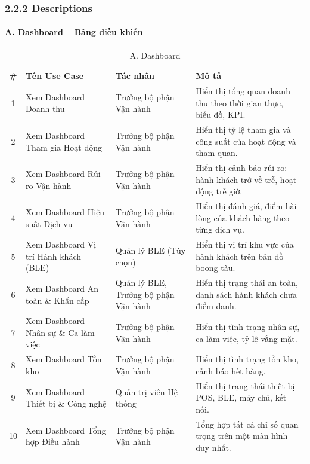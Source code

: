 \documentclass[12pt,a4paper]{article}
\begin{document}
	\subsubsection*{2.2.2 Descriptions}
	
	\paragraph{A. Dashboard -- Bảng điều khiển}
	\begin{longtable}{|c|p{4.5cm}|p{3.5cm}|p{4.5cm}|}
		\hline
		\textbf{\#} & \textbf{Tên Use Case} & \textbf{Tác nhân} & \textbf{Mô tả} \\
		\hline
		1 & Xem Dashboard Doanh thu & Trưởng bộ phận Vận hành & Hiển thị tổng quan doanh thu theo thời gian thực, biểu đồ, KPI. \\
		\hline
		2 & Xem Dashboard Tham gia Hoạt động & Trưởng bộ phận Vận hành & Hiển thị tỷ lệ tham gia và công suất của hoạt động và tham quan. \\
		\hline
		3 & Xem Dashboard Rủi ro Vận hành & Trưởng bộ phận Vận hành & Hiển thị cảnh báo rủi ro: hành khách trở về trễ, hoạt động trễ giờ. \\
		\hline
		4 & Xem Dashboard Hiệu suất Dịch vụ & Trưởng bộ phận Vận hành & Hiển thị đánh giá, điểm hài lòng của khách hàng theo từng dịch vụ. \\
		\hline
		5 & Xem Dashboard Vị trí Hành khách (BLE) & Quản lý BLE (Tùy chọn) & Hiển thị vị trí khu vực của hành khách trên bản đồ boong tàu. \\
		\hline
		6 & Xem Dashboard An toàn \& Khẩn cấp & Quản lý BLE, Trưởng bộ phận Vận hành & Hiển thị trạng thái an toàn, danh sách hành khách chưa điểm danh. \\
		\hline
		7 & Xem Dashboard Nhân sự \& Ca làm việc & Trưởng bộ phận Vận hành & Hiển thị tình trạng nhân sự, ca làm việc, tỷ lệ vắng mặt. \\
		\hline
		8 & Xem Dashboard Tồn kho & Trưởng bộ phận Vận hành & Hiển thị tình trạng tồn kho, cảnh báo hết hàng. \\
		\hline
		9 & Xem Dashboard Thiết bị \& Công nghệ & Quản trị viên Hệ thống & Hiển thị trạng thái thiết bị POS, BLE, máy chủ, kết nối. \\
		\hline
		10 & Xem Dashboard Tổng hợp Điều hành & Trưởng bộ phận Vận hành & Tổng hợp tất cả chỉ số quan trọng trên một màn hình duy nhất. \\
		\hline
		\caption*{A. Dashboard}
	\end{longtable}
	
\end{document}

